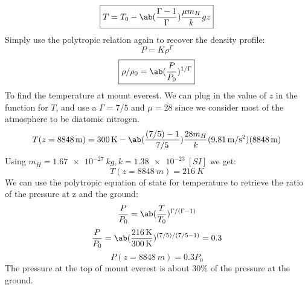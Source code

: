 \begin{equation}
    \boxed{T = T_0 - \ab(\frac{\Gamma-1}{\Gamma})\frac{\mu m_H}{k}g z}
\end{equation}
Simply use the polytropic relation again to recover the density profile:
\begin{equation}
    P = K\rho^\Gamma
\end{equation}
\begin{equation}
    \boxed{\rho/\rho_0 = \ab(\frac{P}{P_0})^{1/\Gamma}}
\end{equation}
To find the temperature at mount everest. We can plug in the value of $z$ in the function for $T$, and use a $\Gamma = 7/5$ and $\mu=28$ since we consider most of the atmosphere to be diatomic nitrogen.
\begin{equation}
    T(z = \qty{8848}{m}) = \qty{300}{K} - \ab(\frac{(7/5)-1}{7/5})\frac{28 m_H}{k}(\qty{9.81}{m/s^2})(\qty{8848}{m})
\end{equation}
Using $m_H = \qty{1.67e-27}{kg}, k = \qty{1.38e-23}{[SI]}$ we get:
\begin{equation}
    \boxed{T(z = \qty{8848}{m}) = \qty{216}{K}}
\end{equation}
We can use the polytropic equation of state for temperature to retrieve the ratio of the pressure at z and the ground:
\begin{equation}
    \frac{P}{P_0} = \ab(\frac{T}{T_0})^{\Gamma/(\Gamma-1)}
\end{equation}
\begin{equation}
    \frac{P}{P_0} = \ab(\frac{\qty{216}{K}}{\qty{300}{K}})^{(7/5)/(7/5-1)} = 0.3 
\end{equation}
\begin{equation}
    \boxed{P(z=\qty{8848}{m}) = 0.3P_0}
\end{equation}
The pressure at the top of mount everest is about $30\%$ of the pressure at the ground.